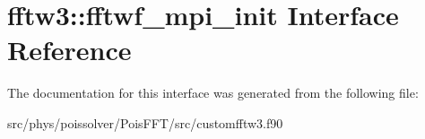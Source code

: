 \hypertarget{interfacefftw3_1_1fftwf__mpi__init}{}\section{fftw3\+:\+:fftwf\+\_\+mpi\+\_\+init Interface Reference}
\label{interfacefftw3_1_1fftwf__mpi__init}


The documentation for this interface was generated from the following file\+:\begin{DoxyCompactItemize}
\item 
src/phys/poissolver/\+Pois\+F\+F\+T/src/customfftw3.\+f90\end{DoxyCompactItemize}
